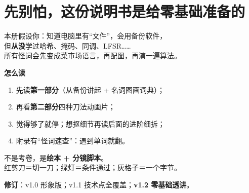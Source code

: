\chapter*{先别怕，这份说明书是给零基础准备的}

\begin{keyidea}[你不需要先会编程]
本册假设你：知道电脑里有``文件''，会用备份软件，\\
但\textbf{从没}学过哈希、掩码、同调、LFSR……\\
所有怪词会先变成菜市场语言，再配图，再演一遍算法。
\end{keyidea}

\textbf{怎么读}
\begin{enumerate}[nosep]
  \item 先读\textbf{第一部分}（从备份讲起 + 名词图画词典）；
  \item 再看\textbf{第二部分}四种刀法动画片；
  \item 觉得够了就停；想抠细节再读后面的进阶细拆；
  \item 附录有``怪词速查''：遇到单词就翻。
\end{enumerate}

\begin{metaphor}[这本书像什么]
不是考卷，是\textbf{绘本 + 分镜脚本}。\\
红剪刀＝切一刀；绿灯＝条件通过；灰格子＝一个字节。
\end{metaphor}

\vspace{0.5em}
\noindent\textbf{修订}：v1.0 形象版；v1.1 技术点全覆盖；\textbf{v1.2 零基础透讲}。
